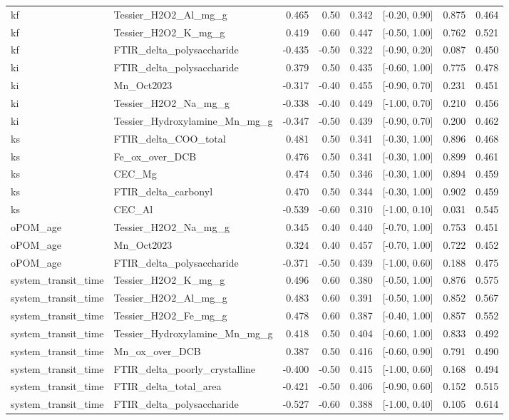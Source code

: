 \documentclass[preprint,12pt]{elsarticle}
\begin{document}
\begin{landscape}
\begin{longtable}{llrrrrrr}
kf & Tessier\_H2O2\_Al\_mg\_g & 0.465 & 0.50 & 0.342 & [-0.20, 0.90] & 0.875 & 0.464 \\
kf & Tessier\_H2O2\_K\_mg\_g & 0.419 & 0.60 & 0.447 & [-0.50, 1.00] & 0.762 & 0.521 \\
kf & FTIR\_delta\_polysaccharide & -0.435 & -0.50 & 0.322 & [-0.90, 0.20] & 0.087 & 0.450 \\
ki & FTIR\_delta\_polysaccharide & 0.379 & 0.50 & 0.435 & [-0.60, 1.00] & 0.775 & 0.478 \\
ki & Mn\_Oct2023 & -0.317 & -0.40 & 0.455 & [-0.90, 0.70] & 0.231 & 0.451 \\
ki & Tessier\_H2O2\_Na\_mg\_g & -0.338 & -0.40 & 0.449 & [-1.00, 0.70] & 0.210 & 0.456 \\
ki & Tessier\_Hydroxylamine\_Mn\_mg\_g & -0.347 & -0.50 & 0.439 & [-0.90, 0.70] & 0.200 & 0.462 \\
ks & FTIR\_delta\_COO\_total & 0.481 & 0.50 & 0.341 & [-0.30, 1.00] & 0.896 & 0.468 \\
ks & Fe\_ox\_over\_DCB & 0.476 & 0.50 & 0.341 & [-0.30, 1.00] & 0.899 & 0.461 \\
ks & CEC\_Mg & 0.474 & 0.50 & 0.346 & [-0.30, 1.00] & 0.894 & 0.459 \\
ks & FTIR\_delta\_carbonyl & 0.470 & 0.50 & 0.344 & [-0.30, 1.00] & 0.902 & 0.459 \\
ks & CEC\_Al & -0.539 & -0.60 & 0.310 & [-1.00, 0.10] & 0.031 & 0.545 \\
oPOM\_age & Tessier\_H2O2\_Na\_mg\_g & 0.345 & 0.40 & 0.440 & [-0.70, 1.00] & 0.753 & 0.451 \\
oPOM\_age & Mn\_Oct2023 & 0.324 & 0.40 & 0.457 & [-0.70, 1.00] & 0.722 & 0.452 \\
oPOM\_age & FTIR\_delta\_polysaccharide & -0.371 & -0.50 & 0.439 & [-1.00, 0.60] & 0.188 & 0.475 \\
system\_transit\_time & Tessier\_H2O2\_K\_mg\_g & 0.496 & 0.60 & 0.380 & [-0.50, 1.00] & 0.876 & 0.575 \\
system\_transit\_time & Tessier\_H2O2\_Al\_mg\_g & 0.483 & 0.60 & 0.391 & [-0.50, 1.00] & 0.852 & 0.567 \\
system\_transit\_time & Tessier\_H2O2\_Fe\_mg\_g & 0.478 & 0.60 & 0.387 & [-0.40, 1.00] & 0.857 & 0.552 \\
system\_transit\_time & Tessier\_Hydroxylamine\_Mn\_mg\_g & 0.418 & 0.50 & 0.404 & [-0.60, 1.00] & 0.833 & 0.492 \\
system\_transit\_time & Mn\_ox\_over\_DCB & 0.387 & 0.50 & 0.416 & [-0.60, 0.90] & 0.791 & 0.490 \\
system\_transit\_time & FTIR\_delta\_poorly\_crystalline & -0.400 & -0.50 & 0.415 & [-1.00, 0.60] & 0.168 & 0.494 \\
system\_transit\_time & FTIR\_delta\_total\_area & -0.421 & -0.50 & 0.406 & [-0.90, 0.60] & 0.152 & 0.515 \\
system\_transit\_time & FTIR\_delta\_polysaccharide & -0.527 & -0.60 & 0.388 & [-1.00, 0.40] & 0.105 & 0.614 \\
\end{longtable}

\end{landscape}
  
\end{document}
